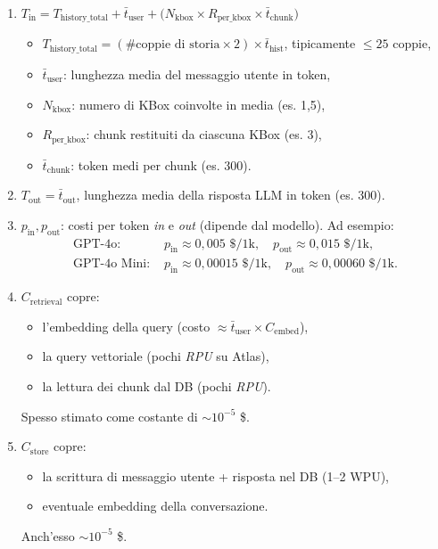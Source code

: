 \documentclass{article}
\begin{document}
\begin{enumerate}
    \item \(\displaystyle T_{\text{in}} =
    T_{\text{history\_total}}
    + \bar{t}_{\text{user}}
    + \bigl(N_{\text{kbox}} \times R_{\text{per\_kbox}} \times \bar{t}_{\text{chunk}}\bigr) \)

    \begin{itemize}
        \item \(T_{\text{history\_total}} = (\text{\# coppie di storia} \times 2) \times \bar{t}_{\text{hist}}\), tipicamente $\le 25$ coppie,
        \item \(\bar{t}_{\text{user}}\): lunghezza media del messaggio utente in token,
        \item \(N_{\text{kbox}}\): numero di KBox coinvolte in media (es. 1,5),
        \item \(R_{\text{per\_kbox}}\): chunk restituiti da ciascuna KBox (es. 3),
        \item \(\bar{t}_{\text{chunk}}\): token medi per chunk (es. 300).
    \end{itemize}

    \item \(\displaystyle T_{\text{out}} = \bar{t}_{\text{out}}\), lunghezza media della risposta LLM in token (es. 300).

    \item \(\displaystyle p_{\text{in}}, p_{\text{out}}\): costi per token \emph{in} e \emph{out} (dipende dal modello). Ad esempio:
    \[
    \begin{aligned}
    \text{GPT-4o: } & p_{\text{in}} \approx 0,005 \text{ \$/1k},\quad p_{\text{out}} \approx 0,015 \text{ \$/1k},\\
    \text{GPT-4o Mini: } & p_{\text{in}} \approx 0,00015 \text{ \$/1k},\quad p_{\text{out}} \approx 0,00060 \text{ \$/1k}.
    \end{aligned}
    \]

    \item \(\displaystyle C_{\text{retrieval}}\) copre:
    \begin{itemize}
        \item l'embedding della query (costo $\approx \bar{t}_{\text{user}} \times C_{\text{embed}}$),
        \item la query vettoriale (pochi \emph{RPU} su Atlas),
        \item la lettura dei chunk dal DB (pochi \emph{RPU}).
    \end{itemize}
    Spesso stimato come costante di $\sim 10^{-5}$ \$.

    \item \(\displaystyle C_{\text{store}}\) copre:
    \begin{itemize}
        \item la scrittura di messaggio utente + risposta nel DB (1--2 WPU),
        \item eventuale embedding della conversazione.
    \end{itemize}
    Anch'esso $\sim 10^{-5}$ \$.
\end{enumerate}
\end{document}
